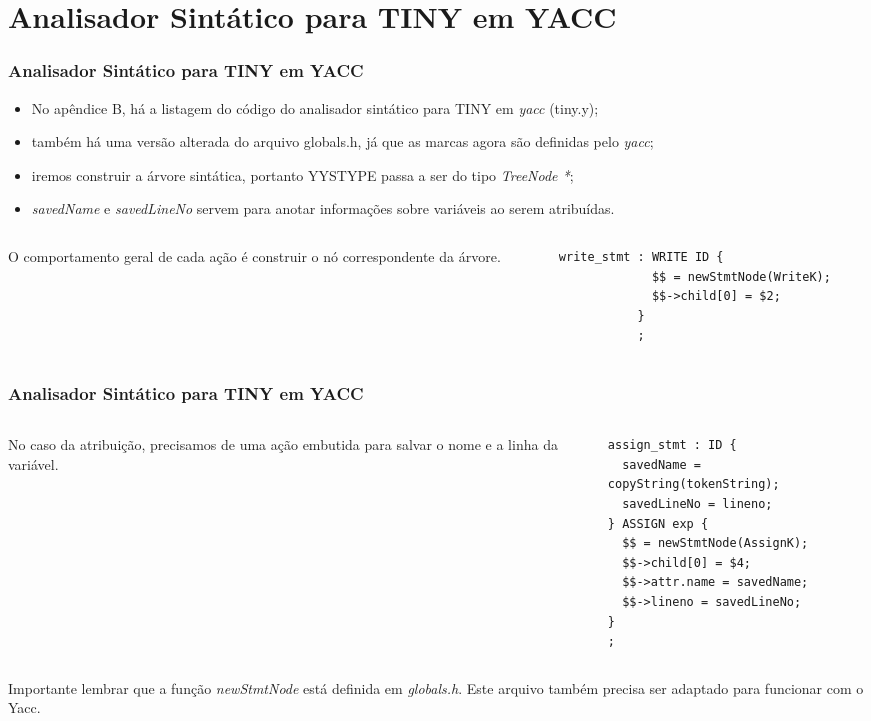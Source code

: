 \documentclass[table]{beamer}
\begin{document}
\section{Analisador Sintático para TINY em YACC}

\begin{frame}[fragile]
   \frametitle{Analisador Sintático para TINY em YACC}
   \begin{itemize}
      \item No apêndice B, há a listagem do código do analisador sintático para TINY em \textit{yacc} (tiny.y);
      \item também há uma versão alterada do arquivo globals.h, já que as marcas agora são definidas pelo \textit{yacc};
      \item iremos construir a árvore sintática, portanto YYSTYPE passa a ser do tipo \textit{TreeNode *};
      \item \textit{savedName} e \textit{savedLineNo} servem para anotar informações sobre variáveis ao serem atribuídas.    
   \end{itemize}
   \begin{columns}
      \begin{column}{0.4\textwidth}
      O comportamento geral de cada ação é construir o nó correspondente da árvore.
      \end{column}
      \begin{column}{0.6\textwidth}
         \small
         \begin{verbatim}
write_stmt : WRITE ID {
             $$ = newStmtNode(WriteK);
             $$->child[0] = $2;
           }
           ;
         \end{verbatim}
      \end{column}
   \end{columns}
\end{frame}

\begin{frame}[fragile]
   \frametitle{Analisador Sintático para TINY em YACC}
   \begin{columns}
      \begin{column}{0.4\textwidth}
      No caso da atribuição, precisamos de uma ação embutida para salvar o nome e a linha da variável.
      \end{column}
      \begin{column}{0.6\textwidth}
         \small
         \begin{verbatim}
assign_stmt : ID {
  savedName = copyString(tokenString);
  savedLineNo = lineno;
} ASSIGN exp {
  $$ = newStmtNode(AssignK);
  $$->child[0] = $4;
  $$->attr.name = savedName;
  $$->lineno = savedLineNo;
}
;
         \end{verbatim}
      \end{column}
   \end{columns}
   Importante lembrar que a função \textit{newStmtNode} está definida em \textit{globals.h}. Este arquivo também precisa ser adaptado para funcionar com o Yacc.
\end{frame}
\end{document}
